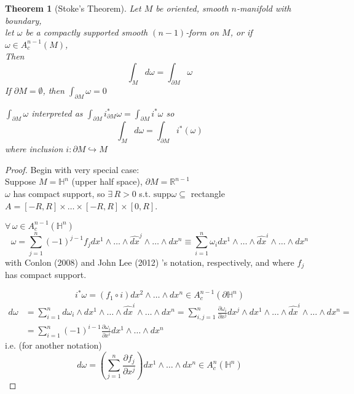 \documentclass[10pt]{amsart}
\newtheorem{theorem}{Theorem}
\begin{document}
\begin{multicols*}{2}
\begin{theorem}[Stoke's Theorem]
	Let $M$ be oriented, smooth $n$-manifold with boundary, \\
	let $\omega$ be a compactly supported smooth $(n-1)$-form on $M$, or if $\omega \in A_c^{n-1}(M)$, \\
	Then
	\begin{equation}
	\int_M d\omega = \int_{\partial M} \omega
	\end{equation} 
	If $\partial M = \emptyset$, then $\int_{\partial M} \omega = 0$
	
	$\int_{\partial M} \omega$ interpreted as $\int_{\partial M} i^*_{\partial M} \omega = \int_{\partial M} i^*\omega$ so 
	\begin{equation}
	\int_M d\omega = \int_{\partial M} i^*(\omega)
	\end{equation}
	where inclusion $i: \partial M \hookrightarrow M$
\end{theorem}

\begin{proof}
Begin with very special case: \\
Suppose $M = \mathbb{H}^n$ (upper half space), $\partial M = \mathbb{R}^{n-1}$ \\
$\omega$ has compact support, so $\exists \, R >0$ s.t. $\text{supp}\omega \subseteq $ rectangle $A=[-R,R] \times \dots \times [-R, R] \times [0,R]$.  

$\forall \, \omega \in A_c^{n-1}(\mathbb{H}^n)$
\begin{equation}
\omega = \sum_{j=1}^n (-1)^{j-1} f_j dx^1 \wedge \dots \wedge \widehat{dx}^j \wedge \dots \wedge dx^n \equiv \sum_{i=1}^n \omega_i dx^1 \wedge \dots \wedge \widehat{dx}^i \wedge \dots \wedge dx^n
\end{equation}
with Conlon (2008) \cite{Conl2008} and John Lee (2012) \cite{JLee2012}'s notation, respectively, and where $f_j$ has compact support.  

\[
i^*\omega = (f_1 \circ i) dx^2 \wedge \dots \wedge dx^n \in A_c^{n-1}(\partial \mathbb{H}^n)
\]
\[ 
\begin{aligned}
d\omega & = \sum_{i=1}^n d\omega_i \wedge dx^1 \wedge \dots \wedge \widehat{dx}^i \wedge \dots \wedge dx^n = \sum_{i,j=1}^n \frac{\partial \omega_i}{ \partial x^j} dx^j \wedge dx^1 \wedge \dots \wedge \widehat{dx}^i \wedge \dots \wedge dx^n = \\
& = \sum_{i=1}^n (-1)^{i-1} \frac{ \partial \omega_i}{ \partial x^i } dx^1 \wedge \dots \wedge dx^n
\end{aligned}
\]
i.e. (for another notation)
\[
d\omega = \left( \sum_{j=1}^n \frac{\partial f_j}{ \partial x^j} \right) dx^1 \wedge \dots \wedge dx^n \in A_c^n(\mathbb{H}^n)
\]


\end{proof}
\end{multicols*}
\end{document}
